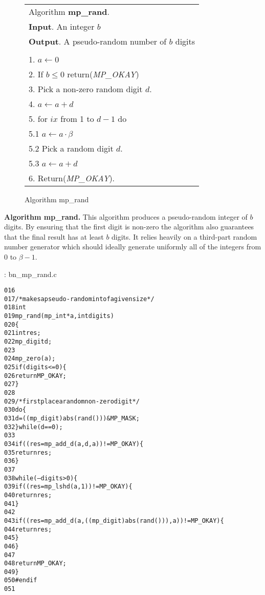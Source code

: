 \documentclass[b5paper]{book}
\begin{document}
\newpage\begin{figure}[!here]
\begin{small}
\begin{center}
\begin{tabular}{l}
\hline Algorithm \textbf{mp\_rand}. \\
\textbf{Input}.   An integer $b$ \\
\textbf{Output}.  A pseudo-random number of $b$ digits \\
\hline \\
1.  $a \leftarrow 0$ \\
2.  If $b \le 0$ return(\textit{MP\_OKAY}) \\
3.  Pick a non-zero random digit $d$. \\
4.  $a \leftarrow a + d$ \\
5.  for $ix$ from 1 to $d - 1$ do \\
\hspace{3mm}5.1  $a \leftarrow a \cdot \beta$ \\
\hspace{3mm}5.2  Pick a random digit $d$. \\
\hspace{3mm}5.3  $a \leftarrow a + d$ \\
6.  Return(\textit{MP\_OKAY}). \\
\hline
\end{tabular}
\end{center}
\end{small}
\caption{Algorithm mp\_rand}
\end{figure}
\textbf{Algorithm mp\_rand.}
This algorithm produces a pseudo-random integer of $b$ digits.  By ensuring that the first digit is non-zero the algorithm also guarantees that the
final result has at least $b$ digits.  It relies heavily on a third-part random number generator which should ideally generate uniformly all of
the integers from $0$ to $\beta - 1$.  

\vspace{+3mm}\begin{small}
\hspace{-5.1mm}{\bf File}: bn\_mp\_rand.c
\vspace{-3mm}
\begin{alltt}
016   
017   /* makes a pseudo-random int of a given size */
018   int
019   mp_rand (mp_int * a, int digits)
020   \{
021     int     res;
022     mp_digit d;
023   
024     mp_zero (a);
025     if (digits <= 0) \{
026       return MP_OKAY;
027     \}
028   
029     /* first place a random non-zero digit */
030     do \{
031       d = ((mp_digit) abs (rand ())) & MP_MASK;
032     \} while (d == 0);
033   
034     if ((res = mp_add_d (a, d, a)) != MP_OKAY) \{
035       return res;
036     \}
037   
038     while (--digits > 0) \{
039       if ((res = mp_lshd (a, 1)) != MP_OKAY) \{
040         return res;
041       \}
042   
043       if ((res = mp_add_d (a, ((mp_digit) abs (rand ())), a)) != MP_OKAY) \{
044         return res;
045       \}
046     \}
047   
048     return MP_OKAY;
049   \}
050   #endif
051   
\end{alltt}
\end{small}
\end{document}
